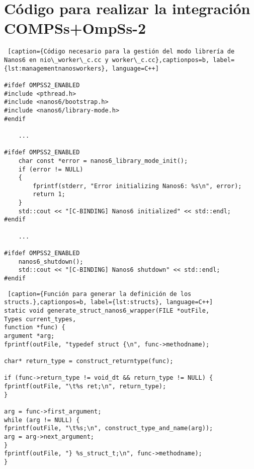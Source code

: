 \section{Código para realizar la integración COMPSs+OmpSs-2}
\label{appendix:integration}

\begin{lstlisting} [caption={Código necesario para la gestión del modo librería de Nanos6 en nio\_worker\_c.cc y worker\_c.cc},captionpos=b, label={lst:managementnanosworkers}, language=C++]

#ifdef OMPSS2_ENABLED
#include <pthread.h>
#include <nanos6/bootstrap.h>
#include <nanos6/library-mode.h>
#endif

    ...

#ifdef OMPSS2_ENABLED
    char const *error = nanos6_library_mode_init();
    if (error != NULL)
    {
        fprintf(stderr, "Error initializing Nanos6: %s\n", error);
        return 1;
    }
    std::cout << "[C-BINDING] Nanos6 initialized" << std::endl;
#endif

    ...
    
#ifdef OMPSS2_ENABLED
    nanos6_shutdown();
    std::cout << "[C-BINDING] Nanos6 shutdown" << std::endl;
#endif

\end{lstlisting}

\bigskip

\begin{lstlisting} [caption={Función para generar la definición de los structs.},captionpos=b, label={lst:structs}, language=C++]
static void generate_struct_nanos6_wrapper(FILE *outFile, 
Types current_types,
function *func) {
argument *arg;
fprintf(outFile, "typedef struct {\n", func->methodname);

char* return_type = construct_returntype(func);

if (func->return_type != void_dt && return_type != NULL) {
fprintf(outFile, "\t%s ret;\n", return_type);
}

arg = func->first_argument;
while (arg != NULL) {
fprintf(outFile, "\t%s;\n", construct_type_and_name(arg));
arg = arg->next_argument;
}
fprintf(outFile, "} %s_struct_t;\n", func->methodname);
}
\end{lstlisting}

\bigskip

